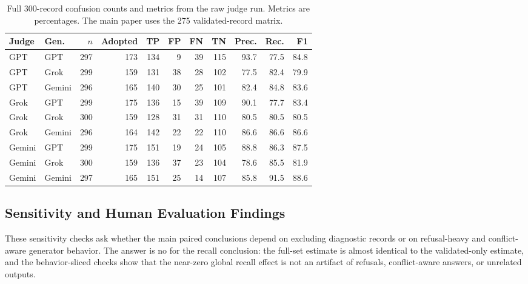 \begin{table}[t]
\centering
\small
\begin{tabular*}{\textwidth}{@{\extracolsep{\fill}}llrrrrrrrrr@{}}
\toprule
Judge & Gen. & $n$ & Adopted & TP & FP & FN & TN & Prec. & Rec. & F1 \\
\midrule
GPT & GPT & 297 & 173 & 134 & 9 & 39 & 115 & 93.7 & 77.5 & 84.8 \\
GPT & Grok & 299 & 159 & 131 & 38 & 28 & 102 & 77.5 & 82.4 & 79.9 \\
GPT & Gemini & 296 & 165 & 140 & 30 & 25 & 101 & 82.4 & 84.8 & 83.6 \\
Grok & GPT & 299 & 175 & 136 & 15 & 39 & 109 & 90.1 & 77.7 & 83.4 \\
Grok & Grok & 300 & 159 & 128 & 31 & 31 & 110 & 80.5 & 80.5 & 80.5 \\
Grok & Gemini & 296 & 164 & 142 & 22 & 22 & 110 & 86.6 & 86.6 & 86.6 \\
Gemini & GPT & 299 & 175 & 151 & 19 & 24 & 105 & 88.8 & 86.3 & 87.5 \\
Gemini & Grok & 300 & 159 & 136 & 37 & 23 & 104 & 78.6 & 85.5 & 81.9 \\
Gemini & Gemini & 297 & 165 & 151 & 25 & 14 & 107 & 85.8 & 91.5 & 88.6 \\
\bottomrule
\end{tabular*}
\caption{Full 300-record confusion counts and metrics from the raw judge run. Metrics are percentages. The main paper uses the 275 validated-record matrix.}
\label{tab:full-metrics}
\end{table}

\FloatBarrier

\subsection{Sensitivity and Human Evaluation Findings}
\label{app:sensitivity}

These sensitivity checks ask whether the main paired conclusions depend on excluding diagnostic records or on refusal-heavy and conflict-aware generator behavior. The answer is no for the recall conclusion: the full-set estimate is almost identical to the validated-only estimate, and the behavior-sliced checks show that the near-zero global recall effect is not an artifact of refusals, conflict-aware answers, or unrelated outputs.

